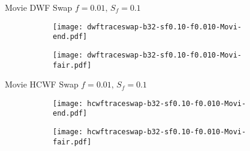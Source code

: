 \documentclass[10pt,a4paper]{beamer}
\begin{document}




\begin{frame}{Movie DWF Swap $f=0.01,\, S_f=0.1$}
	\begin{figure}
		\begin{subfigure}{.48\textwidth}
			\centering
			\texttt{[image: dwftraceswap-b32-sf0.10-f0.010-Movi-end.pdf]}
		\end{subfigure}
		\begin{subfigure}{.48\textwidth}
			\centering
			\texttt{[image: dwftraceswap-b32-sf0.10-f0.010-Movi-fair.pdf]}
		\end{subfigure}
	\end{figure}
\end{frame}
\begin{frame}{Movie HCWF Swap $f=0.01,\, S_f=0.1$}
	\begin{figure}
		\begin{subfigure}{.48\textwidth}
			\centering
			\texttt{[image: hcwftraceswap-b32-sf0.10-f0.010-Movi-end.pdf]}
		\end{subfigure}
		\begin{subfigure}{.48\textwidth}
			\centering
			\texttt{[image: hcwftraceswap-b32-sf0.10-f0.010-Movi-fair.pdf]}
		\end{subfigure}
	\end{figure}
\end{frame}
\end{document}
